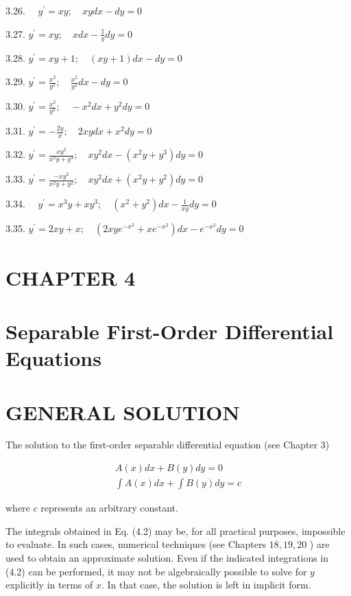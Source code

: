 \documentclass[10pt]{article}
\begin{document}
3.26. $\quad y^{\prime}=x y ; \quad x y d x-d y=0$

3.27. $y^{\prime}=x y ; \quad x d x-\frac{1}{y} d y=0$

3.28. $y^{\prime}=x y+1 ; \quad(x y+1) d x-d y=0$

3.29. $y^{\prime}=\frac{x^{2}}{y^{2}} ; \quad \frac{x^{2}}{y^{2}} d x-d y=0$

3.30. $y^{\prime}=\frac{x^{2}}{y^{2}} ; \quad-x^{2} d x+y^{2} d y=0$

3.31. $y^{\prime}=-\frac{2 y}{x} ; \quad 2 x y d x+x^{2} d y=0$

3.32. $y^{\prime}=\frac{x y^{2}}{x^{2} y+y^{3}} ; \quad x y^{2} d x-\left(x^{2} y+y^{3}\right) d y=0$

3.33. $y^{\prime}=\frac{-x y^{2}}{x^{2} y+y^{2}} ; \quad x y^{2} d x+\left(x^{2} y+y^{2}\right) d y=0$

3.34. $\quad y^{\prime}=x^{3} y+x y^{3} ; \quad\left(x^{2}+y^{2}\right) d x-\frac{1}{x y} d y=0$

3.35. $y^{\prime}=2 x y+x ; \quad\left(2 x y e^{-x^{2}}+x e^{-x^{2}}\right) d x-e^{-x^{2}} d y=0$

\section*{CHAPTER 4}
\section*{Separable First-Order Differential Equations}
\section*{GENERAL SOLUTION}
The solution to the first-order separable differential equation (see Chapter 3)


\begin{gather*}
A(x) d x+B(y) d y=0  \tag{4.1}\\
\int A(x) d x+\int B(y) d y=c \tag{4.2}
\end{gather*}


where $c$ represents an arbitrary constant.

The integrals obtained in Eq. (4.2) may be, for all practical purposes, impossible to evaluate. In such cases, numerical techniques (see Chapters $18,19,20$ ) are used to obtain an approximate solution. Even if the indicated integrations in (4.2) can be performed, it may not be algebraically possible to solve for $y$ explicitly in terms of $x$. In that case, the solution is left in implicit form.
\end{document}
